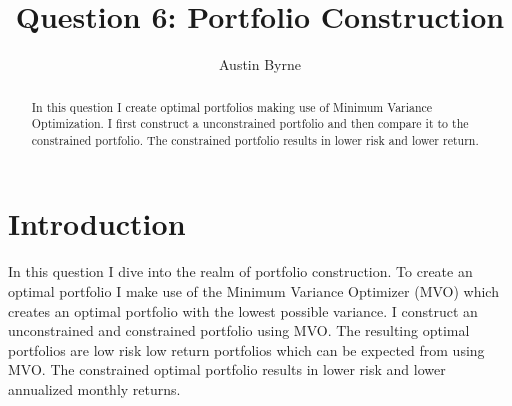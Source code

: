 \documentclass[11pt,preprint, authoryear]{elsarticle}
\numberwithin{equation}{section}
\numberwithin{figure}{section}
\numberwithin{table}{section}
\begin{document}
\begin{frontmatter}  %

\title{Question 6: Portfolio Construction}





\author[Add1]{Austin Byrne}
\ead{}







\begin{abstract}
\small{
In this question I create optimal portfolios making use of Minimum
Variance Optimization. I first construct a unconstrained portfolio and
then compare it to the constrained portfolio. The constrained portfolio
results in lower risk and lower return.
}
\end{abstract}

\vspace{1cm}





\vspace{0.5cm}

\end{frontmatter}

\setcounter{footnote}{0}



\pagestyle{fancy}
\chead{}
\rhead{}
\lfoot{}
\lhead{}
\cfoot{}


\headsep 35pt %




\hypertarget{introduction}{%
\section{\texorpdfstring{Introduction
\label{Introduction}}{Introduction }}\label{introduction}}

In this question I dive into the realm of portfolio construction. To
create an optimal portfolio I make use of the Minimum Variance Optimizer
(MVO) which creates an optimal portfolio with the lowest possible
variance. I construct an unconstrained and constrained portfolio using
MVO. The resulting optimal portfolios are low risk low return portfolios
which can be expected from using MVO. The constrained optimal portfolio
results in lower risk and lower annualized monthly returns.
\end{document}
